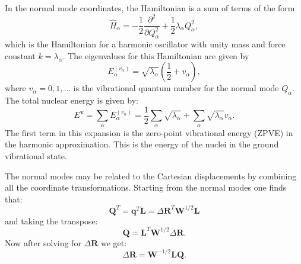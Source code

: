 \documentclass[../Main/chem532-notes.tex]{subfiles}
\begin{document}
In the normal mode coordinates, the Hamiltonian is a sum of terms of the form
\begin{equation}
\hat{H}_\alpha = -\frac{1}{2} \frac{\partial^2}{\partial Q_\alpha^2} + \frac{1}{2} \lambda_\alpha Q_\alpha^2,
\end{equation}
which is the Hamiltonian for a harmonic oscillator with unity mass and force constant $k = \lambda_\alpha$.
The eigenvalues for this Hamiltonian are given by
\begin{equation}
E_{\alpha}^{(v_\alpha)} = \sqrt{\lambda_\alpha}\left(\frac{1}{2} + v_\alpha\right),
\end{equation}
where $v_\alpha = 0,1,\ldots$ is the vibrational quantum number for the normal mode $Q_\alpha$.
The total nuclear energy is given by:
\begin{equation}
E^{\mathbf{v}} = \sum_\alpha E_{\alpha}^{(v_\alpha)}
= \frac{1}{2} \sum_\alpha \sqrt{\lambda_\alpha}
+ \sum_\alpha \sqrt{\lambda_\alpha} v_\alpha.
\end{equation}
The first term in this expansion is the zero-point vibrational energy (ZPVE) in the harmonic approximation.
This is the energy of the nuclei in the ground vibrational state.



The normal modes may be related to the Cartesian displacements by combining all the coordinate transformations.
Starting from the normal modes one finds that: 
\begin{equation}
\mathbf{Q}^{T} = \mathbf{q}^{T} \mathbf{L} =  \Delta\mathbf{R}^{T} \mathbf{W}^{1/2}\mathbf{L}
\end{equation}
and taking the transpose:
\begin{equation}
\mathbf{Q} =  \mathbf{L}^{T} \mathbf{W}^{1/2} \Delta\mathbf{R}.
\end{equation}
Now after solving for $\Delta\mathbf{R}$ we get:
\begin{equation}
\Delta\mathbf{R} = \mathbf{W}^{-1/2}\mathbf{L} \mathbf{Q}.
\end{equation}
\end{document}
